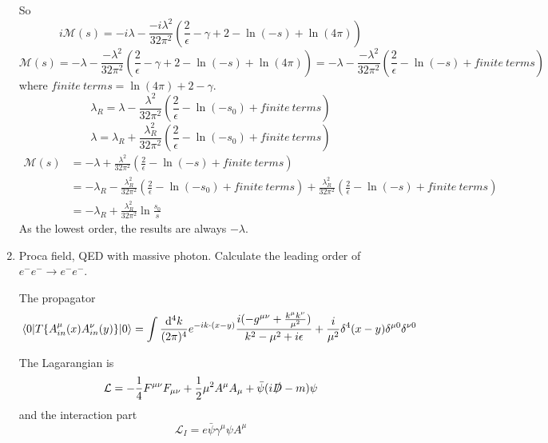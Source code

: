 \documentclass{article}
\newcommand{\gm}{\gamma^{\mu}}
\newcommand{\g}{\gamma}
\newcommand{\la}{\lambda}
\newcommand{\lag}{\mathcal{L}}
\begin{document}
\begin{enumerate}[\bf 1.]
So
$$i\mathcal{M}(s)=-i\la-\frac{-i\la^2}{32\pi^2}(\frac{2}{\epsilon}-\g+2-\ln(-s)+\ln(4\pi))$$
$$\mathcal{M}(s)=-\la-\frac{-\la^2}{32\pi^2}(\frac{2}{\epsilon}-\g+2-\ln(-s)+\ln(4\pi))=-\la-\frac{-\la^2}{32\pi^2}(\frac{2}{\epsilon}-\ln(-s)+finite\ terms)$$
where $finite\ terms=\ln(4\pi)+2-\g$.
$$\la_R=\la-\frac{\la^2}{32\pi^2}(\frac{2}{\epsilon}-\ln(-s_0)+finite\ terms)$$
$$\la=\la_R+\frac{\la_R^2}{32\pi^2}(\frac{2}{\epsilon}-\ln(-s_0)+finite\ terms)$$
\begin{align*}
  \mathcal{M}(s)&=-\la+\frac{\lambda^2}{32\pi^2}(\frac{2}{\epsilon}-\ln{(-s)}+finite\ terms)\\
  &=-\la_R-\frac{\la_R^2}{32\pi^2}(\frac{2}{\epsilon}-\ln{(-s_0)}+finite\ terms)+\frac{\lambda_R^2}{32\pi^2}(\frac{2}{\epsilon}-\ln{(-s)}+finite\ terms)\\
  &=-\la_R+\frac{\la_R^2}{32\pi^2}\ln{\frac{s_0}{s}}
\end{align*}
As the lowest order, the results are always $-\la$.

  \item Proca field, QED with massive photon. Calculate the leading order of $e^-e^-\rightarrow e^-e^-$.

	The propagator
	$$\mel{0}{T\{A_{in}^{\mu}(x)A_{in}^{\nu}(y)\}}{0}=\int\frac{\dd^4k}{(2\pi)^4}e^{-ik\cdot (x-y)}\frac{i(-g^{\mu\nu}+\frac{k^{\mu}k^{\nu}}{\mu^2})}{k^2-\mu^2+i\epsilon}+\frac{i}{\mu^2}\delta^4(x-y)\delta^{\mu0}\delta^{\nu0}$$

The Lagarangian is 
$$\lag=-\frac{1}{4}F^{\mu\nu}F_{\mu\nu}+\frac{1}{2}\mu^2A^{\mu}A_{\mu}+\bar\psi(i\slashed D-m)\psi$$
and the interaction part
$$\lag_I=e\bar\psi\gm\psi A^{\mu}$$
















\end{enumerate}
\end{document}
